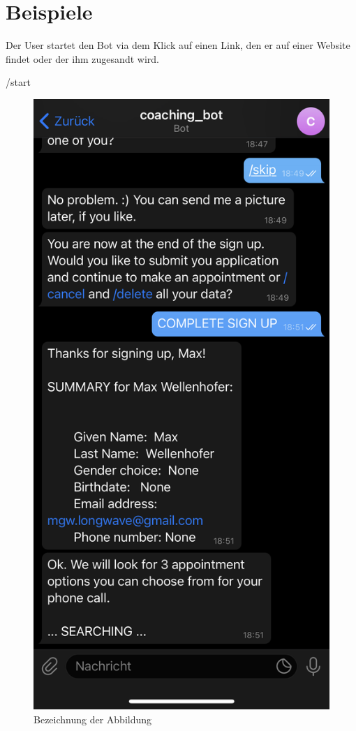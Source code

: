 \chapter{Beispiele}

Der User startet den Bot via dem Klick auf einen Link, den er auf einer Website findet oder der ihm zugesandt wird.

/start
\begin{figure}
	\centering
	\includegraphics[width=1.0\textwidth]{images/coaching_bot_dummy_screenshot.jpeg}
	\caption{Bezeichnung der Abbildung}
	\label{fig: Abbildung 1}
\end{figure}


